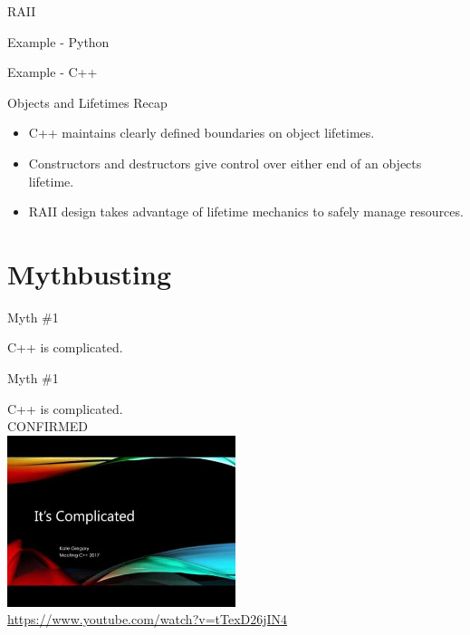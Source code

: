 \documentclass{beamer}
\begin{document}
	
	\begin{frame}{RAII}
		\begin{exampleblock}{Example - Python}
			\lstI
		\end{exampleblock}
		\begin{exampleblock}{Example - C++}
			\lstII
		\end{exampleblock}
	\end{frame}
	
	\begin{frame}{Objects and Lifetimes Recap}
		\begin{itemize}
			\item C++ maintains clearly defined boundaries on object lifetimes.
			\medskip
			\item Constructors and destructors give control over either end of an objects lifetime.
			\medskip
			\item RAII design takes advantage of lifetime mechanics to safely manage resources.
		\end{itemize}
	\end{frame}
		
	\section{Mythbusting}
	
	\begin{frame}{Myth \#1}
		\begin{center}
			C++ is complicated.
		\end{center}
	\end{frame}
	
	\begin{frame}{Myth \#1}
		\begin{center}
			C++ is complicated.\\
			\bigskip
			CONFIRMED\\
			\bigskip
			\href{https://www.youtube.com/watch?v=tTexD26jIN4}{
				\includegraphics[width=0.5\textwidth]{images/its_complicated_thumbnail}
			}\\
			\tiny\url{https://www.youtube.com/watch?v=tTexD26jIN4}
		\end{center}
	\end{frame}
\end{document}
